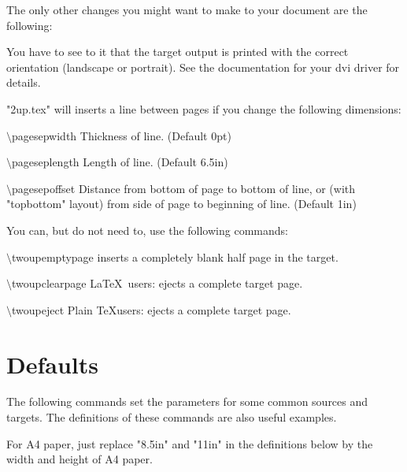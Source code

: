\documentclass[12pt]{article}
\newcommand\namelistlabel[1]{\mbox{\bf #1}\hfil}
\newenvironment{namelist}[1]%
  {\begin{list}{}%
    {\let\makelabel\namelistlabel
    \settowidth{\labelwidth}{#1}
    \setlength{\leftmargin}{1.1\labelwidth}}}%
 {\end{list}}
\begin{document}
The only other changes you might want to make to your document are the
following:
\begin{itemize}
\item You have to see to it that the target output is printed with the
correct orientation (landscape or portrait). See the documentation for your
dvi driver for details.

\item "2up.tex" will inserts a line between pages if you change the following
dimensions:
\begin{namelist}{pagesepwidthxxx}
\item [$\setminus$pagesepwidth]   Thickness of line. (Default 0pt)
\item [$\setminus$pageseplength]  Length of line. (Default 6.5in)
\item [$\setminus$pagesepoffset]  Distance from bottom of page to bottom of
line, or (with "topbottom" layout) from side of page to beginning of line.
(Default 1in)
\end{namelist}

\item You can, but do not need to, use the following commands:
\begin{namelist}{twoupemptypagexxx}

\item [$\setminus$twoupemptypage] inserts a completely blank half page
in the target.

\item [$\setminus$twoupclearpage] \LaTeX\ users: ejects a complete target
page.

\item [$\setminus$twoupeject] Plain \TeX users: ejects a complete target
page.

\end{namelist}
\end{itemize}

\section{Defaults}

  The following commands set the parameters for some common sources and
targets. The definitions of these commands are also useful examples.

  For A4 paper, just replace "8.5in" and "11in" in the definitions below by
the width and height of A4 paper.
\end{document}
